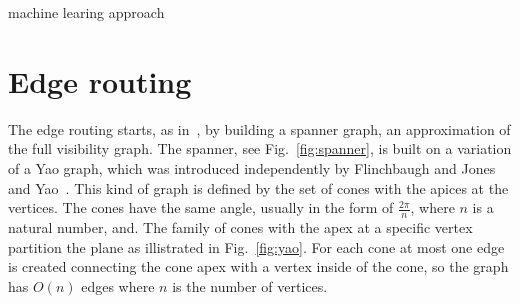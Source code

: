 \documentclass{gd-llncs}
\begin{document}
machine learing approach
\cite{kwon2017would}

\cite{lin2013interactive}

\cite{cosmograph}

\section*{Edge routing}
The edge routing starts, as in~\cite{dwyer2010fast}, by building a spanner graph, an approximation of the full visibility graph. The spanner, see Fig.~\ref{fig:spanner}, is built on a variation of a Yao graph, which was introduced independently by Flinchbaugh and Jones~\cite{flinchbaugh1981strong}  and Yao~\cite{yao1982constructing}. This kind of graph is defined by the set of cones with the apices at the vertices. The cones have the same angle, usually in the form of $\frac{2\pi} {n}$, where $n$ is a natural number, and.  The family of cones with the apex at a specific vertex partition the plane as illistrated in Fig.~\ref{fig:yao}. For each cone at most one edge is created connecting the cone apex with a vertex inside of the cone, so the graph has $O(n)$ edges where $n$ is the number of vertices. \\
\end{document}

